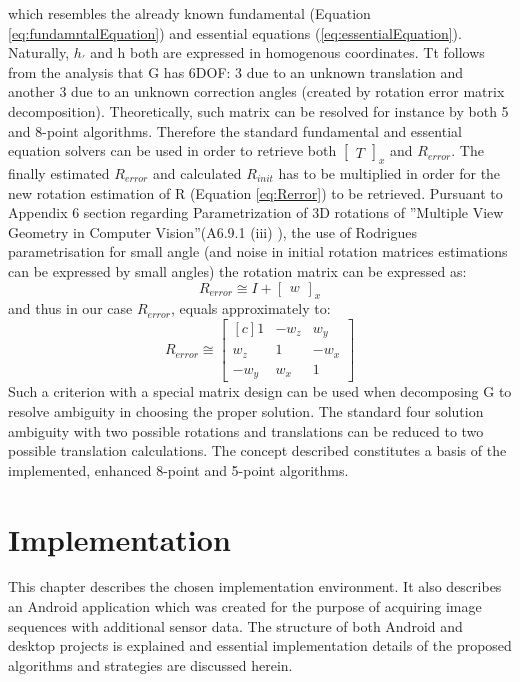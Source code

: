 which resembles the already known fundamental (Equation \ref{eq:fundamntalEquation}) and essential equations (\ref{eq:essentialEquation}). Naturally, $h_{'}$ and h both are expressed in homogenous coordinates. Tt follows from the analysis that G has 6DOF: 3 due to an unknown translation and another 3 due to an unknown correction angles (created by rotation error matrix decomposition). Theoretically, such matrix can be resolved for instance by both 5 and 8-point algorithms. Therefore the standard fundamental and essential equation solvers can be used in order to retrieve both $\begin{bmatrix}T\end{bmatrix}_{x}$ and $R_{error}$.
The finally estimated $R_{error}$ and calculated $R_{init}$ has to be multiplied in order for the new rotation estimation of R (Equation \ref{eq:Rerror}) to be retrieved.
Pursuant to Appendix 6 section regarding Parametrization of 3D rotations of ''Multiple View Geometry in Computer Vision''(A6.9.1 (iii) \cite{HartleyMultipleView}), the use of Rodrigues parametrisation for small angle (and noise in initial rotation matrices estimations can be expressed by small angles) the rotation matrix can be expressed as:
\begin{equation} \label{eq:rodiguesErrorSimple}
R_{error} \cong I + \begin{bmatrix}w\end{bmatrix}_{x}
\end{equation}
and thus in our case $R_{error}$, equals approximately to:
\begin{equation} \label{eq:rodiguesError}
R_{error} \cong 
\begin{bmatrix*}[c]
    1   &  -w_{z}&  w_{y}\\ 
 w_{z}  &    1   & -w_{x}\\
-w_{y}  &  w_{x} &   1
\end{bmatrix*}
\end{equation} 
Such a criterion with a special matrix design can be used when decomposing G to resolve ambiguity in choosing the proper solution. The standard four solution ambiguity with two possible rotations and translations can be reduced to two possible translation calculations. The concept described constitutes a basis of the implemented, enhanced 8-point and 5-point algorithms.

\section{Implementation} %
This chapter describes the chosen implementation environment. It also describes an Android application which was created for the purpose of acquiring image sequences with additional sensor data. The structure of both Android and desktop projects is explained and essential implementation details of the proposed algorithms and strategies are discussed herein.

